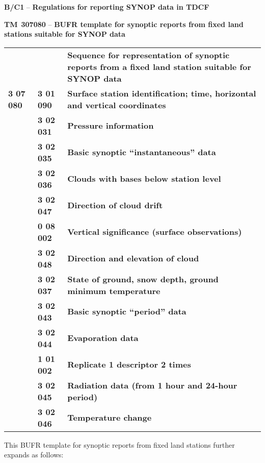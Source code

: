 \textbf{B/C1} -- \textbf{Regulations for reporting SYNOP data in TDCF}

\textbf{TM}~\textbf{307080} -- \textbf{BUFR template for synoptic reports from fixed land stations suitable for SYNOP data}

\begin{longtable}[]{@{}lll@{}}
\toprule
\endhead
& & \textbf{Sequence for representation of synoptic reports from a fixed land station suitable for SYNOP data}\tabularnewline
\textbf{3 07 080} & \textbf{3 01 090} & \textbf{Surface station identification; time, horizontal and vertical coordinates}\tabularnewline
& \textbf{3 02 031} & \textbf{Pressure information}\tabularnewline
& \textbf{3 02 035} & \textbf{Basic synoptic ``instantaneous'' data}\tabularnewline
& \textbf{3 02 036} & \textbf{Clouds with bases below station level}\tabularnewline
& \textbf{3 02 047} & \textbf{Direction of cloud drift}\tabularnewline
& \textbf{0 08 002} & \textbf{Vertical significance (surface observations)}\tabularnewline
& \textbf{3 02 048} & \textbf{Direction and elevation of cloud}\tabularnewline
& \textbf{3 02 037} & \textbf{State of ground, snow depth, ground minimum temperature}\tabularnewline
& \textbf{3 02 043} & \textbf{Basic synoptic ``period'' data}\tabularnewline
& \textbf{3 02 044} & \textbf{Evaporation data}\tabularnewline
& \textbf{1 01 002} & \textbf{Replicate 1 descriptor 2 times}\tabularnewline
& \textbf{3 02 045} & \textbf{Radiation data (from 1 hour and 24-hour period)}\tabularnewline
& \textbf{3 02 046} & \textbf{Temperature change}\tabularnewline
\bottomrule
\end{longtable}

This BUFR template for synoptic reports from fixed land stations further expands as follows:

